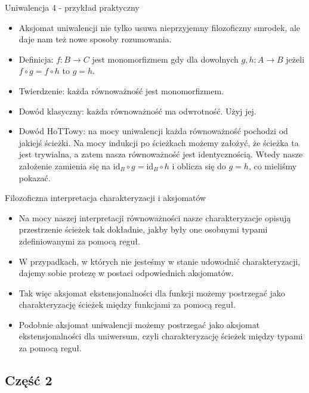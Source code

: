 \documentclass{beamer}
\newcommand{\id}{\text{id}}
\newcommand{\comp}{\circ}
\begin{document}
\begin{frame}{Uniwalencja 4 - przykład praktyczny}
\begin{itemize}
	\item Aksjomat uniwalencji nie tylko usuwa nieprzyjemny filozoficzny smrodek, ale daje nam też nowe sposoby rozumowania.
	\item Definicja: $f : B \to C$ jest monomorfizmem gdy dla dowolnych $g, h : A \to B$ jeżeli $f \comp g = f \comp h$ to $g = h$.
	\item Twierdzenie: każda równoważność jest monomorfizmem.
	\item Dowód klasyczny: każda równoważność ma odwrotność. Użyj jej.
	\item Dowód HoTTowy: na mocy uniwalencji każda równoważność pochodzi od jakiejś ścieżki. Na mocy indukcji po ścieżkach możemy założyć, że ścieżka ta jest trywialna, a zatem nasza równoważność jest identycznością. Wtedy nasze założenie zamienia się na $\id_B \comp g = \id_B \comp h$ i oblicza się do $g = h$, co mieliśmy pokazać.
\end{itemize}
\end{frame}

\begin{frame}{Filozoficzna interpretacja charakteryzacji i aksjomatów}
\begin{itemize}
	\item Na mocy naszej interpretacji równoważności nasze charakteryzacje opisują przestrzenie ścieżek tak dokładnie, jakby były one osobnymi typami zdefiniowanymi za pomocą reguł.
	\item W przypadkach, w których nie jesteśmy w stanie udowodnić charakteryzacji, dajemy sobie protezę w postaci odpowiednich aksjomatów.
	\item Tak więc aksjomat ekstensjonalności dla funkcji możemy postrzegać jako charakteryzację ścieżek między funkcjami za pomocą reguł.
	\item Podobnie aksjomat uniwalencji możemy postrzegać jako aksjomat ekstensjonalności dla uniwersum, czyli charakteryzację ścieżek między typami za pomocą reguł.
\end{itemize}
\end{frame}

\subsection{Część 2}
\end{document}
